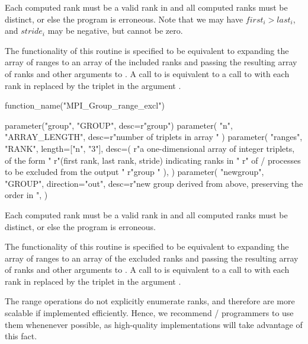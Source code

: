 Each computed rank must be a valid
rank in  and all computed ranks must be distinct, or else the
program is erroneous.
Note that we may have $first_i > last_i$, and $stride_i$ may be negative, but
cannot be zero.

The functionality of this routine is specified to be equivalent to
expanding the array of ranges to an array of the included ranks and
passing the resulting array of ranks and other arguments to
. A call to  is
equivalent to a call to
 with each rank 
in  replaced by the triplet  in the argument .

%
\begin{mpi-binding}
    function_name("MPI_Group_range_excl")
    
    parameter("group", "GROUP", desc=r"group")
    parameter(
        "n", "ARRAY_LENGTH", desc=r"number of triplets in array "
    )
    parameter(
        "ranges",
        "RANK",
        length=["n", "3"],
        desc=(
            r"a one-dimensional array of integer triplets, of the form "
            r"(first rank, last rank, stride) indicating ranks in "
            r" of \MPI/ processes to be excluded from the output "
            r"group "
        ),
    )
    parameter(
        "newgroup",
        "GROUP",
        direction="out",
        desc=r"new group derived from above, preserving the order in ",
    )
\end{mpi-binding}

\noindent Each computed rank must be a valid
rank in  and all computed ranks must be distinct, or else the
program is erroneous.

The functionality of this routine is specified to be equivalent to
expanding the array of ranges to an array of the excluded ranks and
passing the resulting array of ranks and other arguments to
. A call to  is
equivalent to a call to  with each rank
 in  replaced by the triplet  in the argument
.

\begin{users}
The range operations do not explicitly enumerate ranks, and therefore
are more scalable if implemented efficiently. Hence, we recommend \MPI/ programmers
to use them whenenever possible, as high-quality implementations will
take advantage of this fact.
\end{users}

